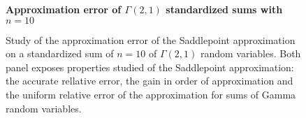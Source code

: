 \begin{example}
    \begin{figure}
        \textbf{Approximation error of $\Gamma(2,1)$ standardized sums with $n=10$}
        \centering
        \caption{Study of the approximation error of the Saddlepoint approximation on a standardized sum of $n=10$ of $\Gamma(2, 1)$ random variables. Both panel exposes properties studied of the Saddlepoint approximation: the accurate rellative error, the gain in order of approximation and the uniform relative error of the approximation for sums of Gamma random variables.}
        \label{fig-saddlepoint-err}
    \end{figure}
    
\end{example}

